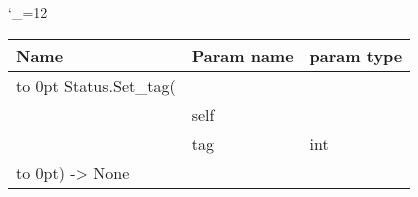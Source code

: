 \begingroup \catcode`\_=12 \tt
\begin{tabular}{lll}
\toprule
\textrm{Name}&\textrm{Param name}&\textrm{param type}\\
\midrule
\hbox to 0pt {Status.Set_tag(\hss}\\
& self\\
& tag & int\\
\hbox to 0pt{) -> None\hss}\\
\bottomrule
\end{tabular}
\endgroup
